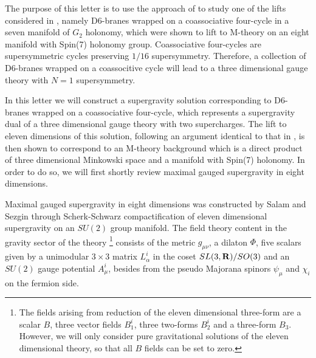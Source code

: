 \documentclass[12pt,a4paper]{article}
\begin{document}
The purpose of this letter is to use the approach of \cite{EN} to study one of the lifts 
considered in \cite{Gomis}, namely D6-branes wrapped on a coassociative four-cycle in a seven 
manifold of $G_2$ holonomy, which were shown to lift to M-theory on an eight manifold with 
Spin(7) holonomy group. Coassociative four-cycles are supersymmetric cycles preserving $1/16$ 
supersymmetry. Therefore, a collection of D6-branes wrapped on a coassocitive cycle will lead 
to a three dimensional gauge theory with $N=1$ supersymmetry.
  
In this letter we will construct a supergravity solution corresponding to D6-branes wrapped 
on a coassociative four-cycle, which represents a supergravity dual of a three dimensional 
gauge theory with two supercharges. The lift to eleven dimensions of this solution, following 
an argument identical to that in \cite{EN}, is then shown to correspond to an M-theory 
background which is a direct product of three dimensional Minkowski space and a manifold 
with Spin(7) holonomy. In order to do so, we will first shortly review maximal gauged 
supergravity in eight dimensions.
  
Maximal gauged supergravity in eight dimensions was constructed by Salam and Sezgin \cite{Salam}
through Scherk-Schwarz compactification \cite{Scherk} of eleven dimensional supergravity on 
an $SU(2)$ group manifold. The field theory content in the gravity sector of the theory 
\footnote{The fields arising from reduction of the eleven dimensional three-form are a scalar 
$B$, three vector fields $B_1^{i}$, three two-forms $B_2^{i}$ and a three-form $B_3$. However, 
we will only consider pure gravitational solutions of the eleven dimensional theory, so that 
all $B$ fields can be set to zero.} consists of the metric $g_{\mu \nu}$, a dilaton 
$\Phi$, five scalars given by a unimodular $3 \times 3$ matrix $L_{\alpha}^{i}$ in the coset 
$SL(3, {\bf R})/SO(3)$ and an $SU(2)$ gauge potential $A_{\mu}^{i}$, besides from the pseudo Majorana 
spinors $\psi_{\mu}$ and $\chi_i$ on the fermion side.
  
\end{document}
